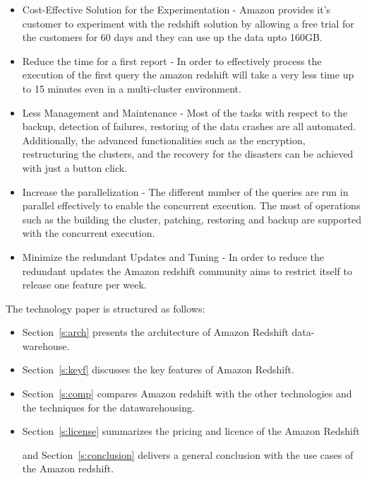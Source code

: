 \begin{itemize}

\item Cost-Effective Solution for the Experimentation - Amazon provides 
it's customer to experiment with the redshift solution by allowing a free 
trial for the customers for 60 days and they can use up the data upto 160GB. 

\item Reduce the time for a first report - In order to effectively process 
the execution of the first query the amazon redshift will take a very less 
time up to 15 minutes even in a multi-cluster environment.

\item Less Management and Maintenance - Most of the tasks with respect 
to the backup, detection of failures, restoring of the data crashes are 
all automated. Additionally, the advanced functionalities such as the 
encryption, restructuring the clusters, and the recovery for the 
disasters can be achieved with just a button click.

\item Increase the parallelization - The different number of the queries 
are run in parallel effectively to enable the concurrent execution. 
The most of operations such as the building the cluster, patching, 
restoring and backup are supported with the concurrent execution.

\item Minimize the redundant Updates and Tuning - In order to reduce 
the redundant updates the Amazon redshift community aims to restrict 
itself to release one feature per week.

\end{itemize}

	The technology paper is structured as follows:

	\begin{itemize}
	\item Section~\ref{s:arch} presents the architecture of Amazon 
	Redshift data-warehouse.
			
	\item Section~\ref{s:keyf} discusses the key features of 
	Amazon Redshift.
			
	\item Section~\ref{s:comp} compares Amazon redshift with the other 
	technologies and the techniques for the datawarehousing.
		
	\item Section~\ref{s:license}
	summarizes the pricing and licence of the Amazon Redshift 
			
	and Section~\ref{s:conclusion} delivers a general conclusion 
	with the use cases of the Amazon redshift.
			
	\end{itemize}

